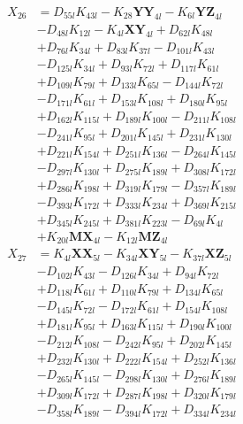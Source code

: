\begin{multicols}{2}
\begin{align}
X_{26} &= D_{55l}K_{43l} - K_{28}\mathbf{YY}_{4l} - K_{6l}\mathbf{YZ}_{4l}  \nonumber \\
&- D_{48l}K_{12l} - K_{4l}\mathbf{XY}_{4l} + D_{62l}K_{48l}  \nonumber \\
&+ D_{76l}K_{34l} + D_{83l}K_{37l} - D_{101l}K_{43l}  \nonumber \\
&- D_{125l}K_{34l} + D_{93l}K_{72l} + D_{117l}K_{61l}  \nonumber \\
&+ D_{109l}K_{79l} + D_{133l}K_{65l} - D_{144l}K_{72l}  \nonumber \\
&- D_{171l}K_{61l} + D_{153l}K_{108l} + D_{180l}K_{95l}  \nonumber \\
&+ D_{162l}K_{115l} + D_{189l}K_{100l} - D_{211l}K_{108l}  \nonumber \\
&- D_{241l}K_{95l} + D_{201l}K_{145l} + D_{231l}K_{130l}  \nonumber \\
&+ D_{221l}K_{154l} + D_{251l}K_{136l} - D_{264l}K_{145l}  \nonumber \\
&- D_{297l}K_{130l} + D_{275l}K_{189l} + D_{308l}K_{172l}  \nonumber \\
&+ D_{286l}K_{198l} + D_{319l}K_{179l} - D_{357l}K_{189l}  \nonumber \\
&- D_{393l}K_{172l} + D_{333l}K_{234l} + D_{369l}K_{215l}  \nonumber \\
&+ D_{345l}K_{245l} + D_{381l}K_{223l} - D_{69l}K_{4l}  \nonumber \\
&+ K_{20l}\mathbf{MX}_{4l} - K_{12l}\mathbf{MZ}_{4l} \nonumber \\
X_{27} &= K_{4l}\mathbf{XX}_{5l} - K_{34l}\mathbf{XY}_{5l} - K_{37l}\mathbf{XZ}_{5l}  \nonumber \\
&- D_{102l}K_{43l} - D_{126l}K_{34l} + D_{94l}K_{72l}  \nonumber \\
&+ D_{118l}K_{61l} + D_{110l}K_{79l} + D_{134l}K_{65l}  \nonumber \\
&- D_{145l}K_{72l} - D_{172l}K_{61l} + D_{154l}K_{108l}  \nonumber \\
&+ D_{181l}K_{95l} + D_{163l}K_{115l} + D_{190l}K_{100l}  \nonumber \\
&- D_{212l}K_{108l} - D_{242l}K_{95l} + D_{202l}K_{145l}  \nonumber \\
&+ D_{232l}K_{130l} + D_{222l}K_{154l} + D_{252l}K_{136l}  \nonumber \\
&- D_{265l}K_{145l} - D_{298l}K_{130l} + D_{276l}K_{189l}  \nonumber \\
&+ D_{309l}K_{172l} + D_{287l}K_{198l} + D_{320l}K_{179l}  \nonumber \\
&- D_{358l}K_{189l} - D_{394l}K_{172l} + D_{334l}K_{234l}  \nonumber \\

\end{align}
\end{multicols}
